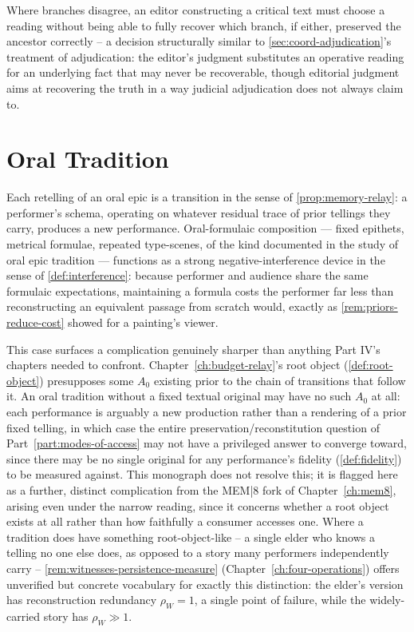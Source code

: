 Where branches disagree, an editor constructing a critical text must
choose a reading without being able to fully recover which branch, if
either, preserved the ancestor correctly -- a decision structurally
similar to \cref{sec:coord-adjudication}'s treatment of adjudication: the
editor's judgment substitutes an operative reading for an underlying
fact that may never be recoverable, though editorial judgment aims at
recovering the truth in a way judicial adjudication does not always
claim to.

\section{Oral Tradition}

Each retelling of an oral epic is a transition in the sense of
\cref{prop:memory-relay}: a performer's schema, operating on whatever
residual trace of prior tellings they carry, produces a new performance.
Oral-formulaic composition --- fixed epithets, metrical formulae,
repeated type-scenes, of the kind documented in the study of oral epic
tradition --- functions as a strong negative-interference device in the
sense of \cref{def:interference}: because performer and audience share
the same formulaic expectations, maintaining a formula costs the
performer far less than reconstructing an equivalent passage from
scratch would, exactly as \cref{rem:priors-reduce-cost} showed for a
painting's viewer.

This case surfaces a complication genuinely sharper than anything Part
IV's chapters needed to confront. Chapter~\ref{ch:budget-relay}'s root
object (\cref{def:root-object}) presupposes some $A_0$ existing prior to
the chain of transitions that follow it. An oral tradition without a
fixed textual original may have no such $A_0$ at all: each performance is
arguably a new production rather than a rendering of a prior fixed
telling, in which case the entire preservation/reconstitution question of
Part~\ref{part:modes-of-access} may not have a privileged answer to
converge toward, since there may be no single original for any
performance's fidelity (\cref{def:fidelity}) to be measured against. This
monograph does not resolve this; it is flagged here as a further, distinct
complication from the MEM|8 fork of Chapter~\ref{ch:mem8}, arising even
under the narrow reading, since it concerns whether a root object exists
at all rather than how faithfully a consumer accesses one. Where a
tradition does have something root-object-like -- a single elder who
knows a telling no one else does, as opposed to a story many performers
independently carry -- \cref{rem:witnesses-persistence-measure}
(Chapter~\ref{ch:four-operations}) offers unverified but concrete
vocabulary for exactly this distinction: the elder's version has
reconstruction redundancy $\rho_W = 1$, a single point of failure, while
the widely-carried story has $\rho_W \gg 1$.


